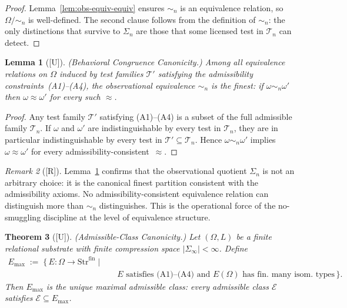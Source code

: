 \documentclass[12pt,oneside]{amsbook}
\theoremstyle{plain}
\newtheorem{theorem}{Theorem}[section]
\newtheorem{lemma}[theorem]{Lemma}
\theoremstyle{definition}
\theoremstyle{remark}
\newtheorem{remark}[theorem]{Remark}
\newcommand{\status}[1]{\textup{[#1]}}
\begin{document}
\begin{proof}
Lemma~\ref{lem:obs-equiv-equiv} ensures $\sim_n$ is an equivalence
relation, so $\Omega/{\sim_n}$ is well-defined.  The second clause
follows from the definition of $\sim_n$: the only distinctions that
survive to $\Sigma_n$ are those that some licensed test in
$\mathcal{T}_n$ can detect.
\end{proof}


\begin{lemma}[\status{U}]\label{lem:behavioral-canonical}
\textup{(Behavioral Congruence Canonicity.)}
Among all equivalence relations on $\Omega$ induced by test families
$\mathcal{T}'$ satisfying the admissibility constraints~\textup{(A1)--(A4)},
the observational equivalence $\sim_n$ is the finest: if $\omega \sim_n
\omega'$ then $\omega \approx \omega'$ for every such $\approx$.
\end{lemma}

\begin{proof}
Any test family $\mathcal{T}'$ satisfying (A1)--(A4) is a subset of the
full admissible family $\mathcal{T}_n$.  If $\omega$ and $\omega'$ are
indistinguishable by every test in $\mathcal{T}_n$, they are in
particular indistinguishable by every test in $\mathcal{T}' \subseteq
\mathcal{T}_n$.  Hence $\omega \sim_n \omega'$ implies $\omega \approx
\omega'$ for every admissibility-consistent~$\approx$.
\end{proof}

\begin{remark}[\status{R}]
Lemma~\ref{lem:behavioral-canonical} confirms that the observational
quotient $\Sigma_n$ is not an arbitrary choice: it is the canonical
finest partition consistent with the admissibility axioms.  No
admissibility-consistent equivalence relation can distinguish more
than $\sim_n$ distinguishes.  This is the operational force of the
no-smuggling discipline at the level of equivalence structure.
\end{remark}


\begin{theorem}[\status{U}]\label{thm:emax-unique}
\textup{(Admissible-Class Canonicity.)}
Let $(\Omega, L)$ be a finite relational substrate with finite
compression space $|\Sigma_\infty| < \infty$.  Define
\begin{equation*}
\begin{split}
  E_{\max} \;:=\; \bigl\{\, E : \Omega \to \mathrm{Str}^{\mathrm{fin}}
  \;\big|\;\\
  &\quad E \text{ satisfies (A1)--(A4) and }
  E(\Omega) \text{ has fin.~many isom.~types}\,\bigr\}.
\end{split}
\end{equation*}
Then $E_{\max}$ is the unique maximal admissible class: every admissible
class $\mathcal{E}$ satisfies $\mathcal{E} \subseteq E_{\max}$.
\end{theorem}
\end{document}
